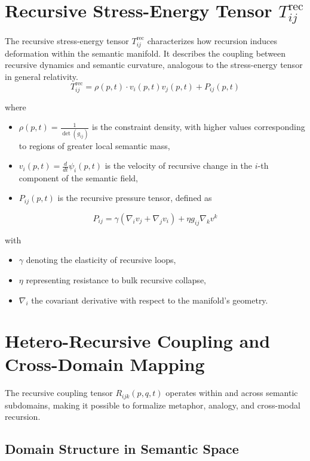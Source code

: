 \section{Recursive Stress-Energy Tensor \(T_{ij}^{\text{rec}}\)}

The recursive stress-energy tensor \(T_{ij}^{\text{rec}}\) characterizes how recursion induces deformation within the semantic manifold. It describes the coupling between recursive dynamics and semantic curvature, analogous to the stress-energy tensor in general relativity.
\begin{equation}
T_{ij}^{\text{rec}} = \rho(p,t) \cdot v_i(p,t) v_j(p,t) + P_{ij}(p,t)
\end{equation}

where
\begin{itemize}
    \item \(\rho(p,t) = \frac{1}{\det(g_{ij})}\) is the constraint density, with higher values corresponding to regions of greater local semantic mass,
    \item \(v_i(p,t) = \frac{d}{dt} \psi_i(p,t)\) is the velocity of recursive change in the \(i\)-th component of the semantic field,
    \item \(P_{ij}(p,t)\) is the recursive pressure tensor, defined as
\end{itemize}
\begin{equation}
P_{ij} = \gamma(\nabla_i v_j + \nabla_j v_i) + \eta g_{ij} \nabla_k v^k
\end{equation}

with
\begin{itemize}
    \item \(\gamma\) denoting the elasticity of recursive loops,
    \item \(\eta\) representing resistance to bulk recursive collapse,
    \item \(\nabla_i\) the covariant derivative with respect to the manifold's geometry.
\end{itemize}

\section{Hetero-Recursive Coupling and Cross-Domain Mapping}

The recursive coupling tensor \(R_{ijk}(p, q, t)\) operates within and across semantic subdomains, making it possible to formalize metaphor, analogy, and cross-modal recursion.

\subsection{Domain Structure in Semantic Space}


